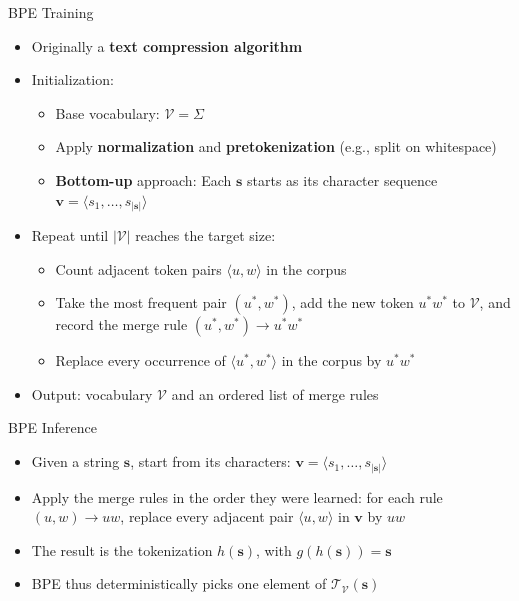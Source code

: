 \documentclass[11pt,compress,t,notes=noshow, xcolor=table]{beamer}
\newcommand{\vocab}{\mathcal{V}}
\begin{document}
\begin{frame}{BPE Training}

\vfill

\begin{itemize}
\item Originally a \textbf{text compression algorithm}
\item Initialization: 
\begin{itemize}
\item Base vocabulary: $\vocab = \Sigma$
\item Apply \textbf{normalization} and \textbf{pretokenization} (e.g., split on whitespace)
\item \textbf{Bottom-up} approach: Each $\mathbf{s}$ starts as its character sequence $\mathbf{v} = \langle s_{1}, \dots, s_{|\mathbf{s}|} \rangle$
\end{itemize}
\item Repeat until $|\vocab|$ reaches the target size:
  \begin{itemize}
  \item Count adjacent token pairs $\langle u, w \rangle$ in the corpus
  \item Take the most frequent pair $(u^*, w^*)$, add the new token $u^*w^*$ to $\vocab$, and record the merge rule $(u^*, w^*) \to u^*w^*$
  \item Replace every occurrence of $\langle u^*, w^* \rangle$ in the corpus by $u^*w^*$
  \end{itemize}
\item Output: vocabulary $\vocab$ and an ordered list of merge rules
\end{itemize}

\vfill

\end{frame}


\begin{frame}{BPE Inference}

\vfill

\begin{itemize}
\item Given a string $\mathbf{s}$, start from its characters: $\mathbf{v} = \langle s_1, \dots, s_{|\mathbf{s}|} \rangle$
\item Apply the merge rules in the order they were learned: for each rule $(u, w) \to uw$, replace every adjacent pair $\langle u, w \rangle$ in $\mathbf{v}$ by $uw$
\item The result is the tokenization $h(\mathbf{s})$, with $g(h(\mathbf{s})) = \mathbf{s}$
\item BPE thus deterministically picks one element of $\mathcal{T}_{\vocab}(\mathbf{s})$
\end{itemize}

\vfill

\end{frame}
\end{document}
